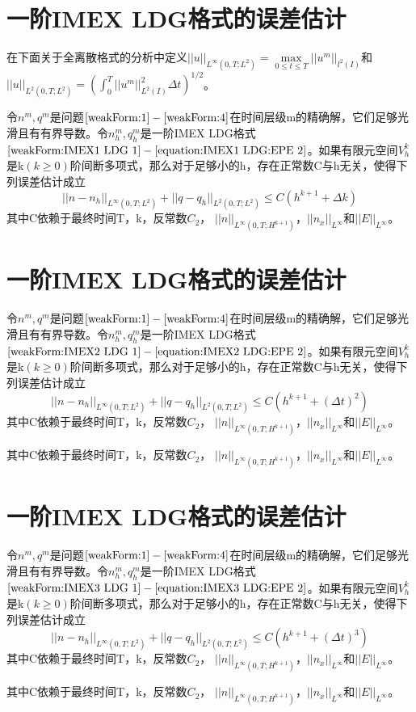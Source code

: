 \documentclass[lang=cn,newtx,10pt,scheme=chinese]{elegantbook}
\begin{document}
\section{一阶IMEX LDG格式的误差估计}
在下面关于全离散格式的分析中定义$||u||_{L^{\infty}(0,T;L^2)}  = \max \limits_{0 \leq t \leq T}||u^m||_{l^2(I)}$和$||u||_{L^2(0,T;L^2)} = (\int_{0}^{T}||u^m||_{L^2(I)}^2\Delta t)^{1/2}$。
\begin{theorem}
    令$n^m,q^m$是问题$\ref{weakForm:1}-\ref{weakForm:4}$在时间层级m的精确解，它们足够光滑且有有界导数。令$n_h^m,q_h^m$是一阶IMEX LDG格式$\ref{weakForm:IMEX1 LDG 1} - \ref{equation:IMEX1 LDG:EPE 2}$。如果有限元空间$V_h^k$是k$(k\geq  0)$阶间断多项式，那么对于足够小的h，存在正常数C与h无关，使得下列误差估计成立
    \begin{equation}
        ||n-n_h||_{L^{\infty}(0,T;L^2)} + ||q - q_h||_{L^2(0,T;L^2)} \leq C(h^{k+1} + \Delta k)
    \end{equation}
    其中C依赖于最终时间T，k，反常数$C_2$， $||n||_{L^{\infty}(0,T;H^{k+1})}$，$||n_x||_{L^{\infty}}$和$||E||_{L^{\infty}}$。
\end{theorem}
\section{一阶IMEX LDG格式的误差估计}
\begin{theorem}
    令$n^m,q^m$是问题$\ref{weakForm:1}-\ref{weakForm:4}$在时间层级m的精确解，它们足够光滑且有有界导数。令$n_h^m,q_h^m$是一阶IMEX LDG格式$\ref{weakForm:IMEX2 LDG 1} - \ref{equation:IMEX2 LDG:EPE 2}$。如果有限元空间$V_h^k$是k$(k\geq  0)$阶间断多项式，那么对于足够小的h，存在正常数C与h无关，使得下列误差估计成立
    \begin{equation}
        ||n-n_h||_{L^{\infty}(0,T;L^2)} + ||q - q_h||_{L^2(0,T;L^2)} \leq C(h^{k+1} + (\Delta t)^2)
    \end{equation}
    其中C依赖于最终时间T，k，反常数$C_2$， $||n||_{L^{\infty}(0,T;H^{k+1})}$，$||n_x||_{L^{\infty}}$和$||E||_{L^{\infty}}$。
\end{theorem}
其中C依赖于最终时间T，k，反常数$C_2$， $||n||_{L^{\infty}(0,T;H^{k+1})}$，$||n_x||_{L^{\infty}}$和$||E||_{L^{\infty}}$。
\section{一阶IMEX LDG格式的误差估计}
\begin{theorem}
    令$n^m,q^m$是问题$\ref{weakForm:1}-\ref{weakForm:4}$在时间层级m的精确解，它们足够光滑且有有界导数。令$n_h^m,q_h^m$是一阶IMEX LDG格式$\ref{weakForm:IMEX3 LDG 1} - \ref{equation:IMEX3 LDG:EPE 2}$。如果有限元空间$V_h^k$是k$(k\geq  0)$阶间断多项式，那么对于足够小的h，存在正常数C与h无关，使得下列误差估计成立
    \begin{equation}
        ||n-n_h||_{L^{\infty}(0,T;L^2)} + ||q - q_h||_{L^2(0,T;L^2)} \leq C(h^{k+1} + (\Delta t)^3)
    \end{equation}
    其中C依赖于最终时间T，k，反常数$C_2$， $||n||_{L^{\infty}(0,T;H^{k+1})}$，$||n_x||_{L^{\infty}}$和$||E||_{L^{\infty}}$。
\end{theorem}
其中C依赖于最终时间T，k，反常数$C_2$， $||n||_{L^{\infty}(0,T;H^{k+1})}$，$||n_x||_{L^{\infty}}$和$||E||_{L^{\infty}}$。
\end{document}
